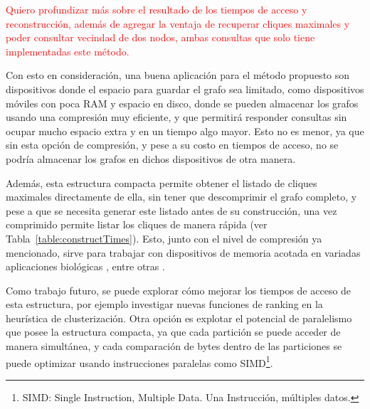 \textcolor{red}{Quiero profundizar más sobre el resultado de los tiempos de acceso y reconstrucción, además de agregar la ventaja de recuperar cliques maximales y poder consultar vecindad de dos nodos, ambas consultas que solo tiene implementadas este método.}

Con esto en consideración, una buena aplicación para el método propuesto son dispositivos donde el espacio para guardar el grafo sea limitado, como dispositivos móviles con poca RAM y espacio en disco, donde se pueden almacenar los grafos usando una compresión muy eficiente, y que permitirá responder consultas sin ocupar mucho espacio extra y en un tiempo algo mayor. Esto no es menor, ya que sin esta opción de compresión, y pese a su costo en tiempos de acceso, no se podría almacenar los grafos en dichos dispositivos de otra manera.

Además, esta estructura compacta permite obtener el listado de cliques maximales directamente de ella, sin tener que descomprimir el grafo completo, y pese a que se necesita generar este listado antes de su construcción, una vez comprimido permite listar los cliques de manera rápida (ver Tabla~\ref{table:constructTimes}). Esto, junto con el nivel de compresión ya mencionado, sirve para trabajar con dispositivos de memoria acotada en variadas aplicaciones biológicas \cite{eblen2012maximum, hendrix2010theoretical}, entre otras \cite{bomze1999maximum}.


Como trabajo futuro, se puede explorar cómo mejorar los tiempos de acceso de esta estructura, por ejemplo investigar nuevas funciones de ranking en la heurística de clusterización. Otra opción es explotar el potencial de paralelismo que posee la estructura compacta, ya que cada partición se puede acceder de manera simultánea, y cada comparación de bytes dentro de las particiones se puede optimizar usando instrucciones paralelas como SIMD\footnote{SIMD: Single Instruction, Multiple Data. Una Instrucción, múltiples datos.}.


